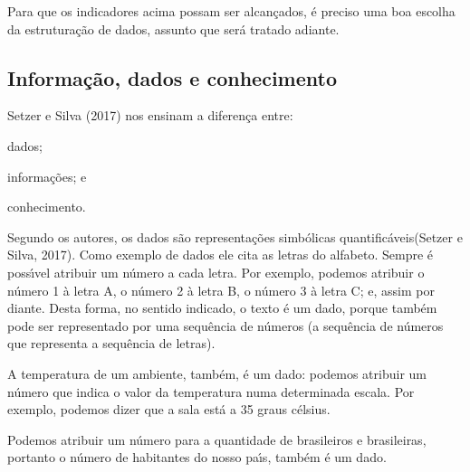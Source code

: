 \documentclass[
12pt,		%
openright,	%
twoside,  %
a4paper,			%
chapter=TITLE,		%
english,			%
french,				%
spanish,			%
brazil				%
]{USPSC-classe/USPSC}
\begin{document}
Para que os indicadores acima possam ser alcan\c{c}ados, \'e preciso uma boa escolha da estrutura\c{c}\~ao de dados, assunto que ser\'a tratado adiante.








\subsection[Informa\c{c}\~ao, dados e conhecimento]{Informa\c{c}\~ao, dados e conhecimento}\label{Informa\c{c}\~ao, dados e conhecimento}
 Setzer e Silva (2017)  nos ensinam a diferen\c{c}a entre:









\begin{alineas}
\item dados;
\item informa\c{c}\~oes; e
\item conhecimento.
\end{alineas}

Segundo os autores, os \textquotedbl  dados \textquotedbl  s\~ao \textquotedbl representa\c{c}\~oes simb\'olicas quantific\'aveis\textquotedbl   (Setzer e Silva, 2017). Como exemplo de dados ele cita as letras do alfabeto. Sempre \'e poss\'{\i}vel atribuir um n\'umero a cada letra. Por exemplo, podemos atribuir o n\'umero 1 \`a letra A, o n\'umero 2 \`a letra B, o n\'umero 3 \`a letra C; e, assim por diante. Desta forma, no sentido indicado, o texto \'e um dado, porque tamb\'em pode ser representado por uma sequ\^encia de n\'umeros (a sequ\^encia de n\'umeros que representa a sequ\^encia de letras).








A temperatura de um ambiente, tamb\'em, \'e um dado: podemos atribuir um n\'umero que indica o valor da temperatura numa determinada escala. Por exemplo, podemos dizer que a sala \textquotedbl est\'a a 35 graus c\'elsius\textquotedbl .








Podemos atribuir um n\'umero para a quantidade de brasileiros e brasileiras, portanto o n\'umero de habitantes do nosso pa\'{\i}s, tamb\'em \'e um dado.
\end{document}
